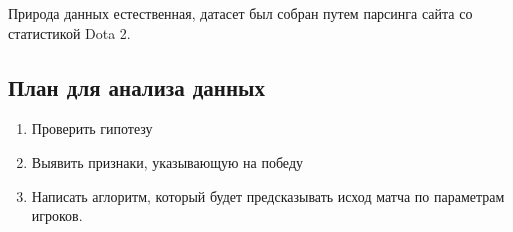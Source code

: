 		Природа данных естественная, датасет был собран путем парсинга сайта со статистикой Dota 2.
	
	\subsection{План для анализа данных}
		\begin{enumerate}
			\item Проверить гипотезу
			\item Выявить признаки, указывающую на победу
			\item Написать аглоритм, который будет предсказывать исход матча по параметрам игроков.
		\end{enumerate}

